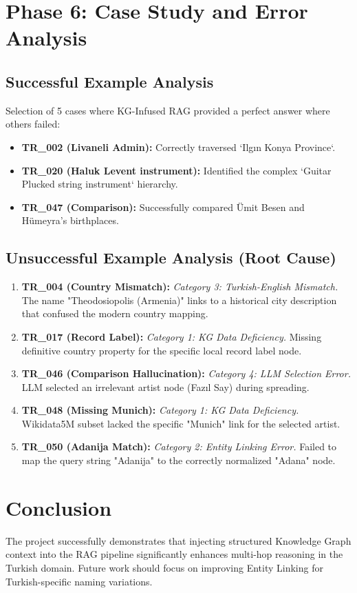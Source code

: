 \documentclass{report}
\begin{document}
\chapter{Phase 6: Case Study and Error Analysis}
\section{Successful Example Analysis}
Selection of 5 cases where KG-Infused RAG provided a perfect answer where others failed:
\begin{itemize}
    \item \textbf{TR\_002 (Livaneli Admin):} Correctly traversed `Ilgın \to Konya Province`.
    \item \textbf{TR\_020 (Haluk Levent instrument):} Identified the complex `Guitar \to Plucked string instrument` hierarchy.
    \item \textbf{TR\_047 (Comparison):} Successfully compared Ümit Besen and Hümeyra's birthplaces.
\end{itemize}
\begin{center}
\end{center}

\section{Unsuccessful Example Analysis (Root Cause)}
\begin{enumerate}
    \item \textbf{TR\_004 (Country Mismatch):} \textit{Category 3: Turkish-English Mismatch.} The name "Theodosiopolis (Armenia)" links to a historical city description that confused the modern country mapping.
    \item \textbf{TR\_017 (Record Label):} \textit{Category 1: KG Data Deficiency.} Missing definitive country property for the specific local record label node.
    \item \textbf{TR\_046 (Comparison Hallucination):} \textit{Category 4: LLM Selection Error.} LLM selected an irrelevant artist node (Fazıl Say) during spreading.
    \item \textbf{TR\_048 (Missing Munich):} \textit{Category 1: KG Data Deficiency.} Wikidata5M subset lacked the specific "Munich" link for the selected artist.
    \item \textbf{TR\_050 (Adanija Match):} \textit{Category 2: Entity Linking Error.} Failed to map the query string "Adanija" to the correctly normalized "Adana" node.
\end{enumerate}

\chapter{Conclusion}
The project successfully demonstrates that injecting structured Knowledge Graph context into the RAG pipeline significantly enhances multi-hop reasoning in the Turkish domain. Future work should focus on improving Entity Linking for Turkish-specific naming variations.
\end{document}
